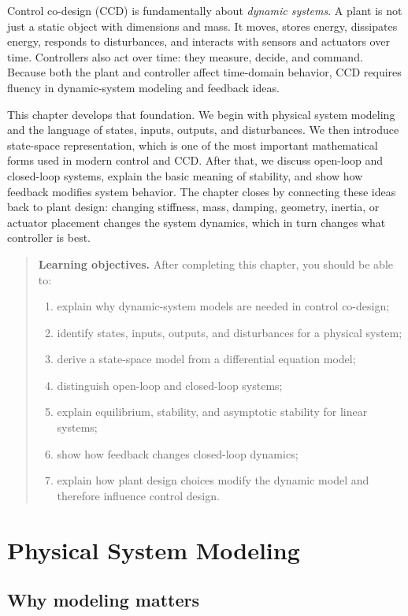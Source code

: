 \documentclass[11pt]{article}
\newenvironment{learningobjectives}{%
\begin{quote}\color{black}\textbf{Learning objectives.} After completing this chapter, you should be able to:
\begin{enumerate}[leftmargin=1.4em,itemsep=0.35em,topsep=0.5em]
}{\end{enumerate}\end{quote}}
\begin{document}
Control co-design (CCD) is fundamentally about \emph{dynamic systems}. A plant is not just a static object with dimensions and mass. It moves, stores energy, dissipates energy, responds to disturbances, and interacts with sensors and actuators over time. Controllers also act over time: they measure, decide, and command. Because both the plant and controller affect time-domain behavior, CCD requires fluency in dynamic-system modeling and feedback ideas.

This chapter develops that foundation. We begin with physical system modeling and the language of states, inputs, outputs, and disturbances. We then introduce state-space representation, which is one of the most important mathematical forms used in modern control and CCD. After that, we discuss open-loop and closed-loop systems, explain the basic meaning of stability, and show how feedback modifies system behavior. The chapter closes by connecting these ideas back to plant design: changing stiffness, mass, damping, geometry, inertia, or actuator placement changes the system dynamics, which in turn changes what controller is best.

\begin{learningobjectives}
  \item explain why dynamic-system models are needed in control co-design;
  \item identify states, inputs, outputs, and disturbances for a physical system;
  \item derive a state-space model from a differential equation model;
  \item distinguish open-loop and closed-loop systems;
  \item explain equilibrium, stability, and asymptotic stability for linear systems;
  \item show how feedback changes closed-loop dynamics;
  \item explain how plant design choices modify the dynamic model and therefore influence control design.
\end{learningobjectives}

\section{Physical System Modeling}

\subsection{Why modeling matters}
\end{document}
